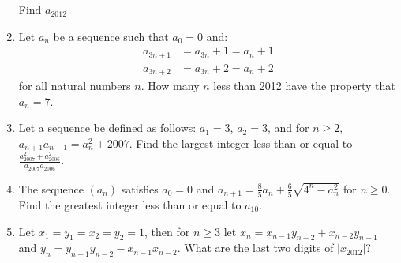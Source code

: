 \documentclass[11pt]{article}
\theoremstyle{theorem}
\theoremstyle{definition}
\theoremstyle{remark}
\theoremstyle{definition}
\theoremstyle{remark}
\begin{document}
\begin{enumerate}
Find $a_{2012}$ %
\item Let $a_n$ be a sequence such that $a_0=0$ and:
\begin{align*}
a_{3n+1} &= a_{3n} + 1= a_n + 1 \\
a_{3n+2} &= a_{3n} + 2 = a_n + 2
\end{align*}
for all natural numbers $n$. How many $n$ less than 2012 have the property that $a_n=7$. %
\item Let a sequence be defined as follows: $a_{1}= 3$, $a_{2}= 3$, and for $n \ge 2$, $a_{n+1}a_{n-1}= a_{n}^{2}+2007$. Find the largest integer less than or equal to $\frac{a_{2007}^{2}+a_{2006}^{2}}{a_{2007}a_{2006}}$. %
\item The sequence $(a_n)$ satisfies $a_0=0$ and $a_{n+1}=\frac{8}{5}a_n+\frac{6}{5}\sqrt{4^n-a_n^2}$ for $n\ge 0$. Find the greatest integer less than or equal to $a_{10}$.
\item Let $x_1=y_1=x_2=y_2=1$, then for $n \ge 3$ let $x_n=x_{n-1}y_{n-2}+x_{n-2}y_{n-1}$ and $y_{n}=y_{n-1}y_{n-2}-x_{n-1}x_{n-2}$. What are the last two digits of $|x_{2012}|$? %
\end{enumerate}
\end{document}
